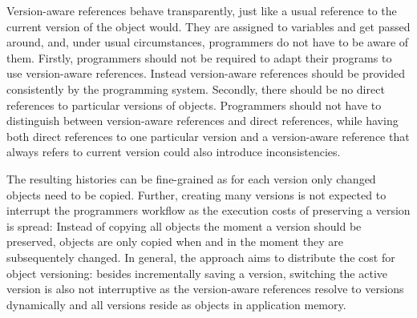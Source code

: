 

Version-aware references behave transparently, just like a usual reference to the current version of the object would.
They are assigned to variables and get passed around, and, under usual circumstances, programmers do not have to be aware of them.
Firstly, programmers should not be required to adapt their programs to use version-aware references.
Instead version-aware references should be provided consistently by the programming system.
Secondly, there should be no direct references to particular versions of objects.
Programmers should not have to distinguish between version-aware references and direct references, while having both direct references to one particular version and a version-aware reference that always refers to current version could also introduce inconsistencies.






The resulting histories can be fine-grained as for each version only changed objects need to be copied.
Further, creating many versions is not expected to interrupt the programmers workflow as the execution costs of preserving a version is spread: Instead of copying all objects the moment a version should be preserved, objects are only copied when and in the moment they are subsequentely changed.
In general, the approach aims to distribute the cost for object versioning: besides incrementally saving a version, switching the active version is also not interruptive as the version-aware references resolve to versions dynamically and all versions reside as objects in application memory.


